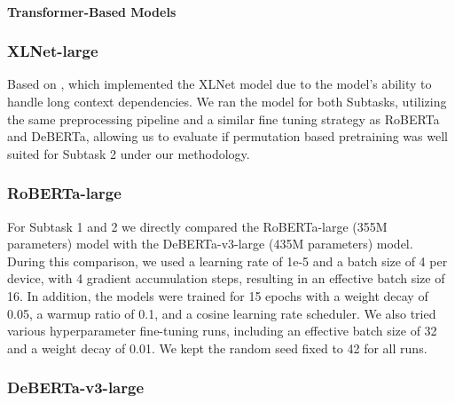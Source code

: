 \documentclass[11pt]{article}
\begin{document}
\paragraph{Transformer-Based Models}

\subsubsection{XLNet-large}
Based on \citet{thomas2024isaidthatdataset}, which implemented the XLNet model due to the model’s ability to handle long context dependencies. We ran the model for both Subtasks, utilizing the same preprocessing pipeline and a similar fine tuning strategy as RoBERTa and DeBERTa, allowing us to evaluate if permutation based pretraining was well suited for Subtask 2 under our methodology.

\subsubsection{RoBERTa-large}
For Subtask 1 and 2 we directly compared the RoBERTa-large (355M parameters) model with the DeBERTa-v3-large (435M parameters) model. During this comparison, we used a learning rate of 1e-5 and a batch size of 4 per device, with 4 gradient accumulation steps, resulting in an effective batch size of 16. In addition, the models were trained for 15 epochs with a weight decay of 0.05, a warmup ratio of 0.1, and a cosine learning rate scheduler. We also tried various hyperparameter fine-tuning runs, including an effective batch size of 32 and a weight decay of 0.01. We kept the random seed fixed to 42 for all runs.

\subsubsection{DeBERTa-v3-large}
\end{document}
